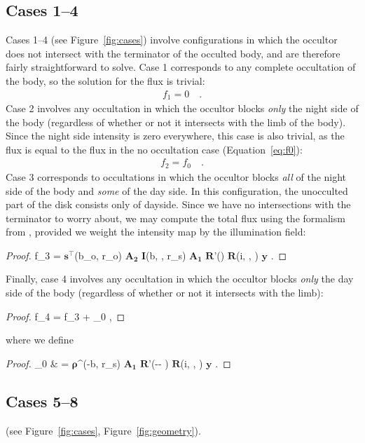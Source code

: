 \documentclass[modern]{aastex62}
\newcommand{\BF}[1]{\ensuremath{\mathbf{#1}}}
\newcommand{\BS}[1]{\ensuremath{\boldsymbol{#1}}}
\newcommand{\sTe}{\ensuremath{\BF{s}^\top}}
\begin{document}
\subsection{Cases 1--4}
\label{sec:cases-1-4}
%
Cases 1--4 (see Figure~\ref{fig:cases}) involve configurations in which the
occultor does not intersect with
the terminator of the occulted body, and are therefore fairly
straightforward to solve.
%
Case 1 corresponds to any complete occultation of the body, so the
solution for the flux is trivial:
%
\begin{align}
    \label{eq:sT1}
    f_1 = 0
    \quad.
\end{align}
%
Case 2 involves any occultation in which the occultor blocks \emph{only} the
night side of the body (regardless of whether or not it intersects with the
limb of the body). Since the night side intensity is zero everywhere, this case
is also trivial, as the flux is equal to the flux in the no occultation case
(Equation~\ref{eq:f0}):
%
\begin{align}
    \label{eq:sT2}
    f_2 = f_0
    \quad.
\end{align}
%
Case 3 corresponds to occultations in which the occultor blocks \emph{all} of
the night side of the body and \emph{some} of the day side. In this
configuration, the unocculted part of the disk consists only of dayside.
Since we have no intersections with the terminator to worry about,
we may compute the total flux using the \starry formalism from
\citet{Luger2019}, provided we weight the intensity map by the illumination
field:
%
\begin{proof}{}
    \label{eq:f3}
    f_3 = \sTe(b_o, r_o)
    \BF{A_2}
    \BF{I}(b, \theta, r_s)
    \BF{A_1}
    \BF{R}'(\omega)
    \BF{R}(i, \lambda, \vartheta)
    \BF{y}
    \quad.
\end{proof}
%
Finally, case 4 involves any occultation in which the occultor blocks
\emph{only} the day side of the body (regardless of whether or not it
intersects with the limb):
%
\begin{proof}{}
    \label{eq:sT4}
    f_4 = f_3 + _0
    \quad,
\end{proof}
%
where we define
%
\begin{proof}{}
    \label{eq:f0hat}
    _0 & =
    \BS{\rho}^\top(-b, r_s)
    \BF{A_1}
    \BF{R}'(-\theta - \pi)
    \BF{R}(i, \lambda, \vartheta)
    \BF{y}
    \quad.
\end{proof}

%

\subsection{Cases 5--8}
\label{sec:cases-5-8}
%
 (see Figure~\ref{fig:cases}, Figure~\ref{fig:geometry}).
\end{document}
